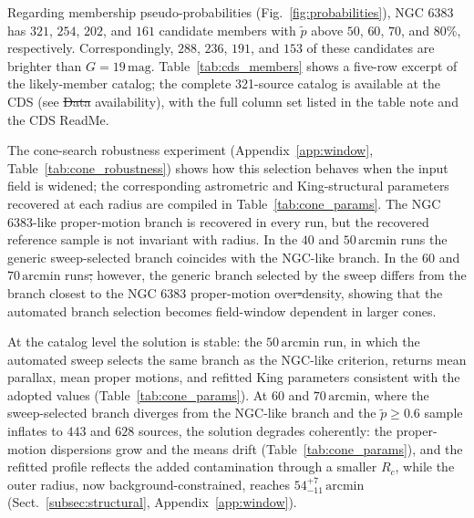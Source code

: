 \documentclass{aa}
\providecommand{\DIFaddtex}[1]{{\protect\color{red}\uwave{#1}}} %
\providecommand{\DIFdeltex}[1]{{\protect\color{red}\sout{#1}}} %
\providecommand{\DIFaddbegin}{} %
\providecommand{\DIFaddend}{} %
\providecommand{\DIFdelbegin}{} %
\providecommand{\DIFdelend}{} %
\providecommand{\DIFadd}[1]{\texorpdfstring{\DIFaddtex{#1}}{#1}} %
\providecommand{\DIFdel}[1]{\texorpdfstring{\DIFdeltex{#1}}{}} %
\providecommand{\DIFscaledelfig}{0.5}
\newlength{\DIFdelgraphicswidth} %
\newlength{\DIFdelgraphicsheight} %
\providecommand{\DIFaddincludegraphics}[2][]{{\color{blue}\fbox{\DIFOincludegraphics[#1]{#2}}}} %
\providecommand{\DIFdelincludegraphics}[2][]{%
\sbox{\DIFdelgraphicsbox}{\DIFOincludegraphics[#1]{#2}}%
\settoboxwidth{\DIFdelgraphicswidth}{\DIFdelgraphicsbox} %
\settoboxtotalheight{\DIFdelgraphicsheight}{\DIFdelgraphicsbox} %
\scalebox{\DIFscaledelfig}{%
\parbox[b]{\DIFdelgraphicswidth}{\usebox{\DIFdelgraphicsbox}\\[-\baselineskip] \rule{\DIFdelgraphicswidth}{0em}}\llap{\resizebox{\DIFdelgraphicswidth}{\DIFdelgraphicsheight}{%
\setlength{\unitlength}{\DIFdelgraphicswidth}%
\begin{picture}(1,1)%
\thicklines\linethickness{2pt} %
{\color[rgb]{1,0,0}\put(0,0){\framebox(1,1){}}}%
{\color[rgb]{1,0,0}\put(0,0){\line( 1,1){1}}}%
{\color[rgb]{1,0,0}\put(0,1){\line(1,-1){1}}}%
\end{picture}%
}\hspace*{3pt}}} %
} %
\DeclareRobustCommand{\DIFaddbegin}{\DIFOaddbegin \let\includegraphics\DIFaddincludegraphics} %
\DeclareRobustCommand{\DIFaddend}{\DIFOaddend \let\includegraphics\DIFOincludegraphics} %
\DeclareRobustCommand{\DIFdelbegin}{\DIFOdelbegin \let\includegraphics\DIFdelincludegraphics} %
\DeclareRobustCommand{\DIFdelend}{\DIFOaddend \let\includegraphics\DIFOincludegraphics} %
\begin{document}
Regarding membership pseudo-probabilities (Fig.~\ref{fig:probabilities}), NGC 6383 has $321$, $254$, $202$, and $161$ candidate members with $\tilde{p}$ above $50$, $60$, $70$, and $80$\%, respectively. Correspondingly, $288$, $236$, $191$, and $153$ of these candidates are brighter than $G=19\,\mathrm{mag}$. Table~\ref{tab:cds_members} shows a five-row excerpt of the likely-member catalog; the complete 321-source catalog is available at the CDS (see \DIFdelbegin \DIFdel{Data }\DIFdelend \DIFaddbegin \DIFadd{the section on data }\DIFaddend availability), with the full column set listed in the table note and the CDS ReadMe.

The cone-search robustness experiment (Appendix~\ref{app:window}, Table~\ref{tab:cone_robustness}) shows how this selection behaves when the input field is widened; the corresponding astrometric and King-structural parameters recovered at each radius are compiled in Table~\ref{tab:cone_params}. The NGC 6383-like proper-motion branch is recovered in every run, but the recovered reference sample is not invariant with radius. In the $40$ and $50\,\mathrm{arcmin}$ runs the generic sweep-selected branch coincides with the NGC-like branch. In the $60$ and $70\,\mathrm{arcmin}$ runs\DIFdelbegin \DIFdel{; }\DIFdelend \DIFaddbegin \DIFadd{, }\DIFaddend however, the generic branch selected by the sweep differs from the branch closest to the NGC 6383 proper-motion over\DIFdelbegin \DIFdel{-}\DIFdelend density, showing that the automated branch selection becomes field-window dependent in larger cones.

At the catalog level the solution is stable: the $50\,\mathrm{arcmin}$ run, in which the automated sweep selects the same branch as the NGC-like criterion, returns mean parallax, mean proper motions, and refitted King parameters consistent with the adopted values (Table~\ref{tab:cone_params}). At $60$ and $70\,\mathrm{arcmin}$, where the sweep-selected branch diverges from the NGC-like branch and the $\tilde{p}\geq0.6$ sample inflates to $443$ and $628$ sources, the solution degrades coherently: the proper-motion dispersions grow and the means drift (Table~\ref{tab:cone_params}), and the refitted profile reflects the added contamination through a smaller $R_c$, while the outer radius, now background-constrained, reaches $54^{+7}_{-11}\,\mathrm{arcmin}$ (Sect.~\ref{subsec:structural}, Appendix~\ref{app:window}).
\end{document}
